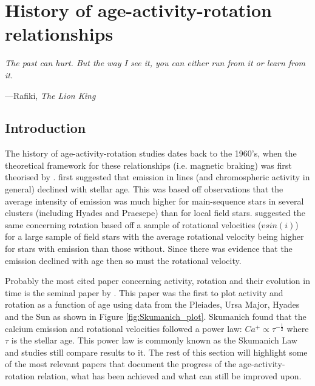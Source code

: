 
\chapter{History of age-activity-rotation relationships} %

\label{Chapter2} %


\epigraph{\itshape The past can hurt. But the way I see it, you can either run from it or learn from it.}{---Rafiki, \textit{The Lion King}}


\section{Introduction}

The history of age-activity-rotation studies dates back to the 1960's, when the theoretical framework for these relationships (i.e. magnetic braking) was first theorised by \citet{Schatzman_1962}. \citet{Wilson_1963} first suggested that emission in \caII lines (and chromospheric activity in general) declined with stellar age. This was based off observations that the average intensity of \caII emission was much higher for main-sequence stars in several clusters (including Hyades and Praesepe) than for local field stars. \citet{Kraft_1967} suggested the same concerning rotation based off a sample of rotational velocities ($vsin(i)$) for a large sample of field stars with the average rotational velocity being higher for stars with \caII emission than those without. Since there was evidence that the \caII emission declined with age then so must the rotational velocity.

Probably the most cited paper concerning activity, rotation and their evolution in time is the seminal paper by \citet{Skumanich_1972}. This paper was the first to plot activity and rotation as a function of age using data from the Pleiades, Ursa Major, Hyades and the Sun as shown in Figure \ref{fig:Skumanich_plot}. Skumanich found that the calcium emission and rotational velocities followed a power law: $Ca^{+} \propto \tau^{-\frac{1}{2}}$ where $\tau$ is the stellar age. This power law is commonly known as the Skumanich Law and studies still compare results to it. The rest of this section will highlight some of the most relevant papers that document the progress of the age-activity-rotation relation, what has been achieved and what can still be improved upon.

